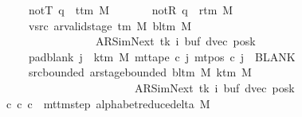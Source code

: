 \begin{isabellebody}
\ \ \ \ \ \ \ notT{\isacharcolon}{\kern0pt}\ {\isachardoublequoteopen}q\ {\isasymnoteq}\ t{\isacharunderscore}{\kern0pt}tm\ M{\isachardoublequoteclose}\isanewline
\ \ \ \ \ \ \ notR{\isacharcolon}{\kern0pt}\ {\isachardoublequoteopen}q\ {\isasymnoteq}\ r{\isacharunderscore}{\kern0pt}tm\ M{\isachardoublequoteclose}\isanewline
\ \ \ \ \ \ \ vsrc{\isacharcolon}{\kern0pt}\ {\isachardoublequoteopen}ar{\isacharunderscore}{\kern0pt}valid{\isacharunderscore}{\kern0pt}stage\ {\isacharparenleft}{\kern0pt}{\isasymGamma}{\isacharunderscore}{\kern0pt}tm\ M{\isacharparenright}{\kern0pt}\ {\isacharparenleft}{\kern0pt}bl{\isacharunderscore}{\kern0pt}tm\ M{\isacharparenright}{\kern0pt}\isanewline
\ \ \ \ \ \ \ \ \ \ \ \ \ \ \ \ \ \ \ {\isacharparenleft}{\kern0pt}AR{\isacharunderscore}{\kern0pt}SimNext{\isacharcomma}{\kern0pt}\ tk{\isacharcomma}{\kern0pt}\ i{\isacharcomma}{\kern0pt}\ buf{\isacharcomma}{\kern0pt}\ dvec{\isacharcomma}{\kern0pt}\ posk{\isacharparenright}{\kern0pt}{\isachardoublequoteclose}\isanewline
\ \ \ \ \ \ \ pad{\isacharunderscore}{\kern0pt}blank{\isacharcolon}{\kern0pt}\ {\isachardoublequoteopen}{\isasymforall}j\ {\isasymge}\ k{\isacharunderscore}{\kern0pt}tm\ M{\isachardot}{\kern0pt}\ mt{\isacharunderscore}{\kern0pt}tape\ c{\isacharprime}{\kern0pt}\ j\ {\isacharparenleft}{\kern0pt}mt{\isacharunderscore}{\kern0pt}pos\ c{\isacharprime}{\kern0pt}\ j{\isacharparenright}{\kern0pt}\ {\isacharequal}{\kern0pt}\ BLANK{}{\isachardoublequoteclose}\isanewline
\ \ \ \ \ \ \ src{\isacharunderscore}{\kern0pt}bounded{\isacharcolon}{\kern0pt}\ {\isachardoublequoteopen}ar{\isacharunderscore}{\kern0pt}stage{\isacharunderscore}{\kern0pt}bounded\ {\isacharparenleft}{\kern0pt}bl{\isacharunderscore}{\kern0pt}tm\ M{\isacharparenright}{\kern0pt}\ {\isacharparenleft}{\kern0pt}k{\isacharunderscore}{\kern0pt}tm\ M{\isacharparenright}{\kern0pt}\isanewline
\ \ \ \ \ \ \ \ \ \ \ \ \ \ \ \ \ \ \ \ \ \ \ \ \ \ {\isacharparenleft}{\kern0pt}AR{\isacharunderscore}{\kern0pt}SimNext{\isacharcomma}{\kern0pt}\ tk{\isacharcomma}{\kern0pt}\ i{\isacharcomma}{\kern0pt}\ buf{\isacharcomma}{\kern0pt}\ dvec{\isacharcomma}{\kern0pt}\ posk{\isacharparenright}{\kern0pt}{\isachardoublequoteclose}\isanewline
\ \ \ {\isachardoublequoteopen}{\isasymexists}c{\isacharprime}{\kern0pt}{\isacharprime}{\kern0pt}{\isachardot}{\kern0pt}\ {\isacharparenleft}{\kern0pt}c{\isacharprime}{\kern0pt}{\isacharcomma}{\kern0pt}\ c{\isacharprime}{\kern0pt}{\isacharprime}{\kern0pt}{\isacharparenright}{\kern0pt}\ {\isasymin}\ mttm{\isacharunderscore}{\kern0pt}step\ {\isacharparenleft}{\kern0pt}alphabet{\isacharunderscore}{\kern0pt}reduce{\isacharunderscore}{\kern0pt}delta\ M{\isacharparenright}{\kern0pt}\isanewline

\end{isabellebody}

